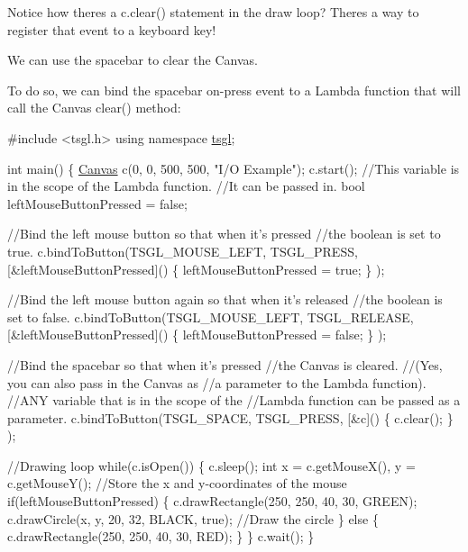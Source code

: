 Notice how there\textquotesingle{}s a c.\+clear() statement in the draw loop? There\textquotesingle{}s a way to register that event to a keyboard key!

We can use the spacebar to clear the Canvas.

To do so, we can bind the spacebar on-\/press event to a Lambda function that will call the Canvas clear() method\+:


\begin{DoxyCode}
\textcolor{preprocessor}{#include <tsgl.h>}
\textcolor{keyword}{using namespace }\hyperlink{namespacetsgl}{tsgl};

\textcolor{keywordtype}{int} main() \{
  \hyperlink{classtsgl_1_1_canvas}{Canvas} c(0, 0, 500, 500, \textcolor{stringliteral}{"I/O Example"});
  c.start();
  \textcolor{comment}{//This variable is in the scope of the Lambda function.}
  \textcolor{comment}{//It can be passed in.}
  \textcolor{keywordtype}{bool} leftMouseButtonPressed = \textcolor{keyword}{false};

  \textcolor{comment}{//Bind the left mouse button so that when it's pressed }
  \textcolor{comment}{//the boolean is set to true.}
  c.bindToButton(TSGL\_MOUSE\_LEFT, TSGL\_PRESS, 
                    [&leftMouseButtonPressed]() \{
                          leftMouseButtonPressed = \textcolor{keyword}{true};
                    \}
                );

  \textcolor{comment}{//Bind the left mouse button again so that when it's released }
  \textcolor{comment}{//the boolean is set to false.}
  c.bindToButton(TSGL\_MOUSE\_LEFT, TSGL\_RELEASE, 
                    [&leftMouseButtonPressed]() \{
                          leftMouseButtonPressed = \textcolor{keyword}{false};
                    \}
                );

  \textcolor{comment}{//Bind the spacebar so that when it's pressed }
  \textcolor{comment}{//the Canvas is cleared.}
  \textcolor{comment}{//(Yes, you can also pass in the Canvas as }
  \textcolor{comment}{//a parameter to the Lambda function).}
  \textcolor{comment}{//ANY variable that is in the scope of the }
  \textcolor{comment}{//Lambda function can be passed as a parameter.}
  c.bindToButton(TSGL\_SPACE, TSGL\_PRESS, 
                    [&c]() \{
                      c.clear();
                    \}
                );

  \textcolor{comment}{//Drawing loop}
  \textcolor{keywordflow}{while}(c.isOpen()) \{
    c.sleep();
    \textcolor{keywordtype}{int} x = c.getMouseX(), y = c.getMouseY();  \textcolor{comment}{//Store the x and y-coordinates of the mouse}
    \textcolor{keywordflow}{if}(leftMouseButtonPressed) \{
      c.drawRectangle(250, 250, 40, 30, GREEN);
      c.drawCircle(x, y, 20, 32, BLACK, \textcolor{keyword}{true});  \textcolor{comment}{//Draw the circle}
    \} \textcolor{keywordflow}{else} \{
      c.drawRectangle(250, 250, 40, 30, RED);
    \}
  \}
  c.wait();
\}
\end{DoxyCode}


